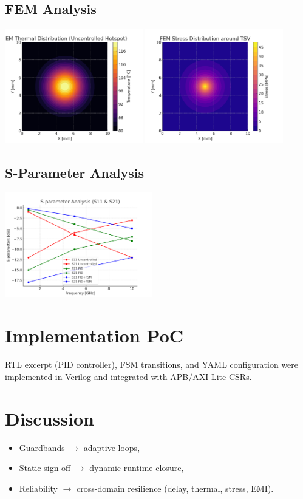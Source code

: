 \documentclass[conference]{IEEEtran}
\begin{document}
\subsection{FEM Analysis}
\includegraphics[width=0.45\textwidth]{fem_thermal_map.png}
\includegraphics[width=0.45\textwidth]{fem_stress_map.png}

\subsection{S-Parameter Analysis}
\includegraphics[width=0.48\textwidth]{sparam_s11s21.png}

\section{Implementation PoC}
RTL excerpt (PID controller), FSM transitions, and YAML configuration were implemented in Verilog and integrated with APB/AXI-Lite CSRs.

\section{Discussion}
\begin{itemize}
  \item Guardbands $\to$ adaptive loops,
  \item Static sign-off $\to$ dynamic runtime closure,
  \item Reliability $\to$ cross-domain resilience (delay, thermal, stress, EMI).
\end{itemize}
\end{document}
